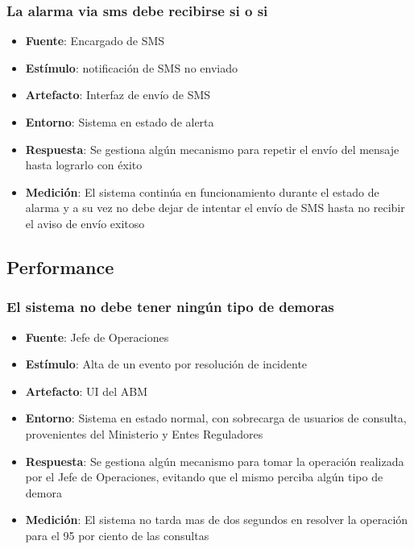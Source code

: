 \subsubsection{La alarma via sms debe recibirse si o si}
\begin{itemize}
\item {\bf Fuente}: Encargado de SMS
\item {\bf Estímulo}: notificación de SMS no enviado
\item {\bf Artefacto}: Interfaz de envío de SMS
\item {\bf Entorno}: Sistema en estado de alerta
\item {\bf Respuesta}: Se gestiona algún mecanismo para repetir el envío del mensaje hasta lograrlo con éxito
\item {\bf Medición}: El sistema continúa en funcionamiento durante el estado de alarma y a su vez no debe dejar de intentar el envío de SMS hasta no recibir el aviso de envío exitoso
\end{itemize}

\subsection{Performance}

\subsubsection{El sistema no debe tener ningún tipo de demoras}
\begin{itemize}
\item {\bf Fuente}: Jefe de Operaciones
\item {\bf Estímulo}: Alta de un evento por resolución de incidente
\item {\bf Artefacto}: UI del ABM
\item {\bf Entorno}: Sistema en estado normal, con sobrecarga de usuarios de consulta, provenientes del Ministerio y Entes Reguladores
\item {\bf Respuesta}: Se gestiona algún mecanismo para tomar la operación realizada por el Jefe de Operaciones, evitando que el mismo perciba algún tipo de demora
\item {\bf Medición}: El sistema no tarda mas de dos segundos en resolver la operación para el 95 por ciento de las consultas
\end{itemize}

